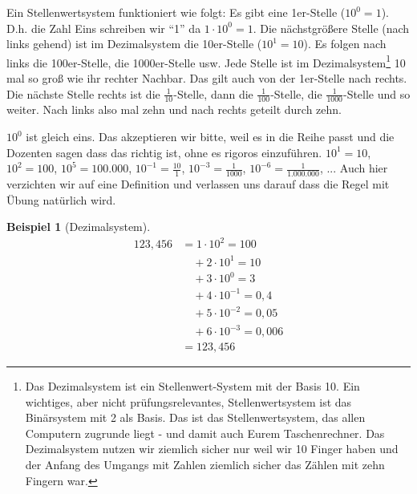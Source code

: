 \documentclass[a4paper]{book}%
\theoremstyle{definition}
\newtheorem{beispiel}{Beispiel}
\begin{document}
Ein Stellenwertsystem funktioniert wie folgt: Es gibt eine 1er-Stelle ($10^0=1$). D.h. die Zahl Eins schreiben wir \enquote{1} da $1 \cdot 10^0 = 1$. Die nächstgrößere Stelle (nach links gehend) ist im Dezimalsystem die 10er-Stelle ($10^1=10$). Es folgen nach links die 100er-Stelle, die 1000er-Stelle usw. Jede Stelle ist im Dezimalsystem\footnote{Das Dezimalsystem ist ein Stellenwert-System mit der Basis 10. Ein wichtiges, aber nicht prüfungsrelevantes, Stellenwertsystem ist das Binärsystem mit 2 als Basis. Das ist das Stellenwertsystem, das allen Computern zugrunde liegt - und damit auch Eurem Taschenrechner. Das Dezimalsystem nutzen wir ziemlich sicher nur weil wir 10 Finger haben und der Anfang des Umgangs mit Zahlen ziemlich sicher das Zählen mit zehn Fingern war.} 10 mal so groß wie ihr rechter Nachbar. Das gilt auch von der 1er-Stelle nach rechts. Die nächste Stelle rechts ist die $\frac{1}{10}$-Stelle, dann die $\frac{1}{100}$-Stelle, die $\frac{1}{1000}$-Stelle und so weiter. Nach links also mal zehn und nach rechts geteilt durch zehn.

$10^0$ ist gleich eins. Das akzeptieren wir bitte, weil es in die Reihe passt und die Dozenten sagen dass das richtig ist, ohne es rigoros einzuführen. $10^1=10$, $10^2=100$, $10^5=100.000$, $10^{-1}=\frac{10}{1}$, $10^{-3}=\frac{1}{1000}$, $10^{-6}=\frac{1}{1.000.000}$, ... Auch hier verzichten wir auf eine Definition und verlassen uns darauf dass die Regel mit Übung natürlich wird.

\begin{beispiel}[Dezimalsystem]\label{bsp:Dezimalsystem01}
    \begin{align}\label{eqn:Dezimalsystem01}
      123,456 &= 1 \cdot 10^2 = 100 \\
       & \quad + 2 \cdot 10^1 = 10  \\
       & \quad + 3 \cdot 10^0 = 3 \\
       & \quad + 4 \cdot 10^{-1} = 0,4\\
       & \quad + 5 \cdot 10^{-2} = 0,05\\
       & \quad + 6 \cdot 10^{-3} = 0,006\\
       &= 123,456
    \end{align}
\end{beispiel}
\end{document}
